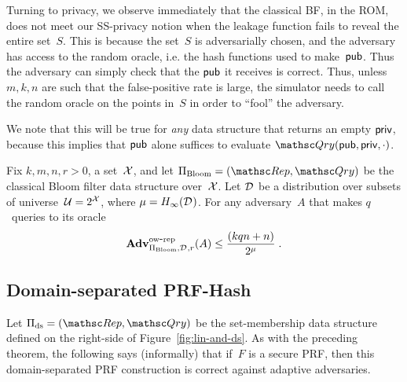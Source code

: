 Turning to privacy, we observe immediately that the classical BF, in the
ROM, does not meet our SS-privacy notion when the leakage function
fails to reveal the entire set~$S$.  This is because the set~$S$ is
adversarially chosen, and the adversary has access to the random
oracle, i.e. the hash functions used to make~${\sf pub}$.  Thus the
adversary can simply check that the ${\sf pub}$ it receives is correct.
Thus, unless $m,k,n$ are such that the false-positive rate is large,
the simulator needs to call the random oracle on the points in~$S$ in order to ``fool'' the adversary.

We note that this will be true for \emph{any} data structure that returns an empty ${\sf priv}$, because this implies that ${\sf pub}$ alone suffices to evaluate $\Qry(\pubaux,\privaux,\cdot)$.

\begin{theorem}\label{thm3}\label{thm:bf-ow}
Fix $k,m,n,r>0$, a set~${\cal X}$, and let $\setprim_{\mathrm{Bloom}}= (\Rep, \Qry)$ be the classical Bloom filter data structure over~${\cal X}$. Let $\mathcal{D}_{}^{}$ be a distribution over subsets of universe~${\cal U}=2^{\cal X}$, where $\mu = H_\infty(\mathcal{D}_{}^{})$.  For any adversary~$A$ that makes $q$~queries to its oracle
\[
\mathrm{\mathbf{Adv}}^{\mathrm{ow\mbox{-}rep}}_{\Pi_{\mathrm{Bloom}},\mathcal{D}_{}^{},r}(A) \leq  \frac{(kqn+n)}{2^{\mu}}\;.
\]
\end{theorem}






\subsection{Domain-separated PRF-Hash}
Let $\setprim_{\mathrm{ds}}= (\Rep, \Qry)$ be the set-membership data
structure defined on the right-side of Figure~\ref{fig:lin-and-ds}.
As with the preceding theorem, the following says (informally) that
if~$F$ is a secure PRF, then this domain-separated PRF construction is
correct against adaptive adversaries.

